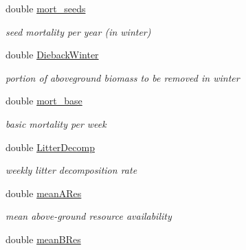 \begin{DoxyCompactItemize}
\mbox{\label{struct_s_run_para_acb3f49d4569ed7107b7f078c7e1ab4b5}} 
double \mbox{\hyperlink{struct_s_run_para_acb3f49d4569ed7107b7f078c7e1ab4b5}{mort\+\_\+seeds}}
\begin{DoxyCompactList}\small\item\em seed mortality per year (in winter) \end{DoxyCompactList}\item 
\mbox{\label{struct_s_run_para_ae0686e627e9e4e98269cc792602ef5f3}} 
double \mbox{\hyperlink{struct_s_run_para_ae0686e627e9e4e98269cc792602ef5f3}{Dieback\+Winter}}
\begin{DoxyCompactList}\small\item\em portion of aboveground biomass to be removed in winter \end{DoxyCompactList}\item 
\mbox{\label{struct_s_run_para_aa6e9dab0a2184ffa7dc21f42851b9542}} 
double \mbox{\hyperlink{struct_s_run_para_aa6e9dab0a2184ffa7dc21f42851b9542}{mort\+\_\+base}}
\begin{DoxyCompactList}\small\item\em basic mortality per week \end{DoxyCompactList}\item 
\mbox{\label{struct_s_run_para_ab13a068a057e9bb737c667b2cbe243bd}} 
double \mbox{\hyperlink{struct_s_run_para_ab13a068a057e9bb737c667b2cbe243bd}{Litter\+Decomp}}
\begin{DoxyCompactList}\small\item\em weekly litter decomposition rate \end{DoxyCompactList}\item 
\mbox{\label{struct_s_run_para_a50c04c8a6a8a9cc18a9fe2f8874bc9c6}} 
double \mbox{\hyperlink{struct_s_run_para_a50c04c8a6a8a9cc18a9fe2f8874bc9c6}{mean\+A\+Res}}
\begin{DoxyCompactList}\small\item\em mean above-\/ground resource availability \end{DoxyCompactList}\item 
\mbox{\label{struct_s_run_para_ac1e1f72d5cfc338d66d392e6c153178d}} 
double \mbox{\hyperlink{struct_s_run_para_ac1e1f72d5cfc338d66d392e6c153178d}{mean\+B\+Res}}

\end{DoxyCompactItemize}
